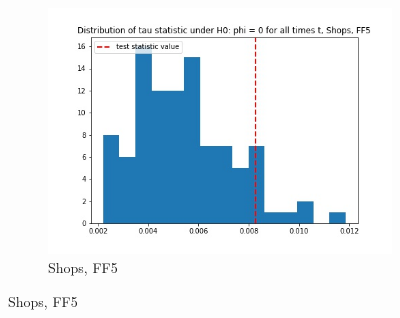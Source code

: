 \documentclass{article}
\begin{document}
\begin{figure}
\begin{subfigure}[b]{0.3\textwidth}
    \includegraphics[width=\textwidth]{Shops/tau_hist_02_FF5.jpg}
    \caption{Shops, FF5}
    \label{fig:2}
  \end{subfigure}
  \end{figure}
\end{document}
